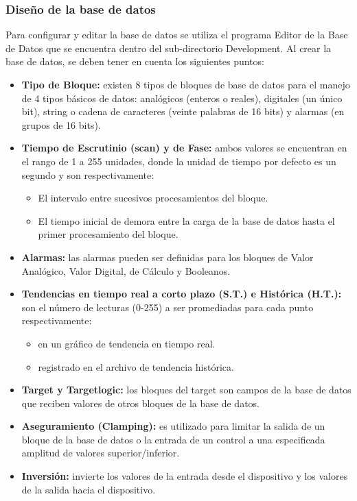 \subsubsection{Diseño de la base de datos}
Para configurar y editar la base de datos se utiliza el programa 
Editor de la Base de Datos que se encuentra dentro del sub-directorio 
Development. Al crear la base de datos, se deben tener en cuenta los 
siguientes puntos:
\begin{itemize}
  \item \textbf{Tipo de Bloque:} existen 8 tipos de bloques de base de datos
para el manejo de 4 tipos básicos de datos: analógicos (enteros o reales),
digitales (un único bit), string o cadena de caracteres (veinte palabras de
16 bits) y alarmas (en grupos de 16 bits).
  \item \textbf{Tiempo de Escrutinio (scan) y de Fase:} ambos valores se
encuentran en el rango de 1 a 255 unidades, donde la
unidad de tiempo por defecto es un segundo y son
respectivamente:
    \begin{itemize}
      \item El intervalo entre sucesivos procesamientos del bloque.
      \item El tiempo inicial de demora entre la carga de la base de datos 
      hasta el primer procesamiento del bloque.
    \end{itemize}
    
  \item \textbf{Alarmas:} las alarmas pueden ser definidas para los bloques de
Valor
    Analógico, Valor Digital, de Cálculo y Booleanos.
  \item \textbf{Tendencias en tiempo real a corto plazo (S.T.) e Histórica 
(H.T.):} son
    el número de lecturas (0-255) a ser promediadas para cada punto 
respectivamente:
    \begin{itemize}
      \item en un gráfico de tendencia en tiempo real.
      \item registrado en el archivo de tendencia histórica.
    \end{itemize}
  \item \textbf{Target y Targetlogic:} los bloques del target son campos de la
base de
    datos que reciben valores de otros bloques de la base de datos.
  \item \textbf{Aseguramiento (Clamping):} es utilizado para limitar la salida
de un
    bloque de la base de datos o la entrada de un control a una especificada 
    amplitud de valores superior/inferior.
  \item \textbf{Inversión:} invierte los valores de la entrada desde el
dispositivo y
    los valores de la salida hacia el dispositivo.
\end{itemize}


